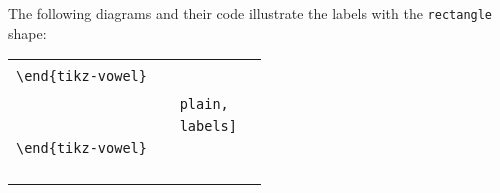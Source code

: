 \documentclass{article}
\begin{document}
\bigskip

\noindent
The following diagrams and their code illustrate the labels with the \texttt{rectangle} shape:

\begin{center}
\begin{tabular}{ll}
  \begin{minipage}[t]{6.5cm}{\small
    \verb|\begin{tikz-vowel}[rectangle,labels]|\\
    \verb|\end{tikz-vowel}|\\}
  \end{minipage} &
  \begin{minipage}[t]{6.5cm}{\small
    \verb|\begin{tikz-vowel}[rectangle,|\\
    \verb|                    plain,|\\
    \verb|                    labels]|\\
    \verb|\end{tikz-vowel}|\\}
  \end{minipage} \\
  \begin{minipage}[t]{6.5cm}{
  \hspace*{-1.75cm}
  \begin{tikz-vowel}\end{tikz-vowel} \\}\end{minipage} &
  \begin{minipage}[t]{6.5cm}{
  \hspace*{-1.5cm}
  \begin{tikz-vowel}\end{tikz-vowel} \\}\end{minipage}
\end{tabular}

\bigskip


\end{center}
\end{document}
